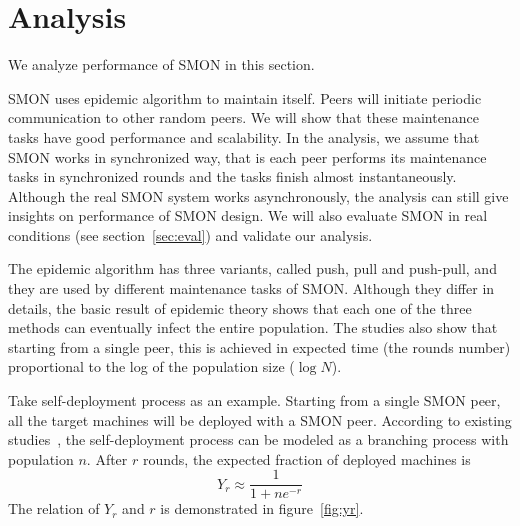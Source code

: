 \section{Analysis}
\label{sec:analysis}

We analyze performance of SMON in this section.

SMON uses epidemic algorithm to maintain itself. Peers will
initiate periodic communication to other random peers. We
will show that these maintenance tasks have good
performance and scalability. In the analysis, we assume that
SMON works in synchronized way, that is each peer performs
its maintenance tasks in synchronized rounds and the tasks
finish almost instantaneously. Although the real SMON system
works asynchronously, the analysis can still give insights
on performance of SMON design. We will also evaluate SMON in
real conditions (see section~\ref{sec:eval}) and validate
our analysis.


The epidemic algorithm has three variants, called push, pull
and push-pull, and they are used by different maintenance
tasks of SMON.
Although they differ in details, the basic result of
epidemic theory shows that each one of the three methods can
eventually infect the entire population.  The studies also
show that starting from a single peer, this is achieved in
expected time (the rounds number) proportional to the log of
the population size ($\log N$).

%
%
%
%
%
%
%

Take self-deployment process as an example. Starting from a
single SMON peer, all the target machines will be deployed
with a SMON peer.  According to existing
studies~\cite{Eugster2004}, the self-deployment process can
be modeled as a branching process with population $n$. After
$r$ rounds, the expected fraction of deployed machines is
\begin{equation*}
Y_r \approx \frac{1}{1+ne^{-r}}
\end{equation*}
The relation of $Y_r$ and $r$ is demonstrated in
figure~\ref{fig:yr}.

